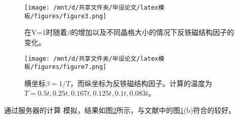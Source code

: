 


\begin{figure}[h]
        \centering   
    \texttt{[image: /mnt/d/共享文件夹/毕设论文/latex模板/figures/figure3.png]}  
    \caption{在V=1时随着$\beta$的增加以及不同晶格大小的情况下反铁磁结构因子的变化\cite{10}。}
    \label{fig5} 
    \end{figure}   
\begin{figure}[h]
    \centering
    \texttt{[image: /mnt/d/共享文件夹/毕设论文/latex模板/figures/figure7.png]} 
    \caption{横坐标$\beta=1/T$，而纵坐标为反铁磁结构因子。计算的温度为$T=0.5t,0.25t,0.167t,0.125t,0.1t,0.083 t$。} 
    \label{fig7}  
\end{figure}  

    
通过服务器的计算 模拟，结果如图\ref{fig7}所示，与文献中的图\ref{fig5}(b)符合的较好。
\vskip5cm

